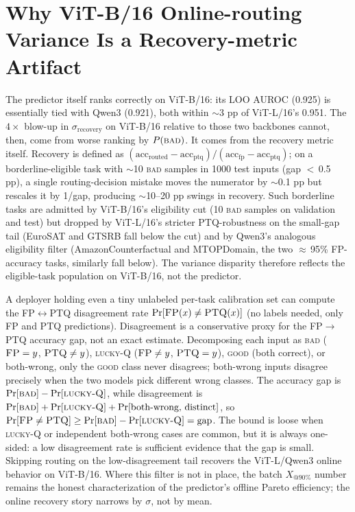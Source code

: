 \documentclass{article}
\makeatletter
\newcommand{\fp}{\textsc{FP}\xspace}
\newcommand{\ptq}{\textsc{PTQ}\xspace}
\newcommand{\good}{\textsc{good}\xspace}
\newcommand{\bad}{\textsc{bad}\xspace}
\newcommand{\luckyq}{\textsc{lucky-Q}\xspace}
\newcommand{\xat}[1]{\ensuremath{X_{@#1\%}}}
\makeatother
\begin{document}


\section{Why ViT-B/16 Online-routing Variance Is a Recovery-metric Artifact}\label{app:online_noise}

The predictor itself ranks correctly on ViT-B/16: its LOO AUROC (0.925) is essentially tied with Qwen3 (0.921), both within $\sim$3 pp of ViT-L/16's 0.951. The $4\times$ blow-up in $\sigma_{\text{recovery}}$ on ViT-B/16 relative to those two backbones cannot, then, come from worse ranking by $P(\bad)$. It comes from the recovery metric itself. Recovery is defined as $(\mathrm{acc}_{\text{routed}} - \mathrm{acc}_{\text{ptq}})/(\mathrm{acc}_{\text{fp}} - \mathrm{acc}_{\text{ptq}})$; on a borderline-eligible task with $\sim$10 \bad{} samples in 1000 test inputs (gap $<$\,0.5 pp), a single routing-decision mistake moves the numerator by $\sim$0.1 pp but rescales it by 1/gap, producing $\sim$10--20 pp swings in recovery. Such borderline tasks are admitted by ViT-B/16's eligibility cut (10 \bad{} samples on validation and test) but dropped by ViT-L/16's stricter PTQ-robustness on the small-gap tail (EuroSAT and GTSRB fall below the cut) and by Qwen3's analogous eligibility filter (AmazonCounterfactual and MTOPDomain, the two $\approx$\,95\% FP-accuracy tasks, similarly fall below). The variance disparity therefore reflects the eligible-task population on ViT-B/16, not the predictor.

A deployer holding even a tiny unlabeled per-task calibration set can compute the \fp{}$\leftrightarrow$\ptq{} disagreement rate $\Pr[\fp(x) \neq \ptq(x)]$ (no labels needed, only \fp{} and \ptq{} predictions). Disagreement is a conservative proxy for the \fp$\to$\ptq{} accuracy gap, not an exact estimate. Decomposing each input as \bad{} ($\fp=y$, $\ptq\neq y$), \luckyq{} ($\fp\neq y$, $\ptq=y$), \good{} (both correct), or both-wrong, only the \good{} class never disagrees; both-wrong inputs disagree precisely when the two models pick different wrong classes. The accuracy gap is $\Pr[\bad] - \Pr[\luckyq]$, while disagreement is $\Pr[\bad] + \Pr[\luckyq] + \Pr[\text{both-wrong, distinct}]$, so $\Pr[\fp \neq \ptq] \geq \Pr[\bad] - \Pr[\luckyq] = \text{gap}$. The bound is loose when \luckyq{} or independent both-wrong cases are common, but it is always one-sided: a low disagreement rate is sufficient evidence that the gap is small. Skipping routing on the low-disagreement tail recovers the ViT-L/Qwen3 online behavior on ViT-B/16. Where this filter is not in place, the batch \xat{90} number remains the honest characterization of the predictor's offline Pareto efficiency; the online recovery story narrows by $\sigma$, not by mean.
\end{document}
